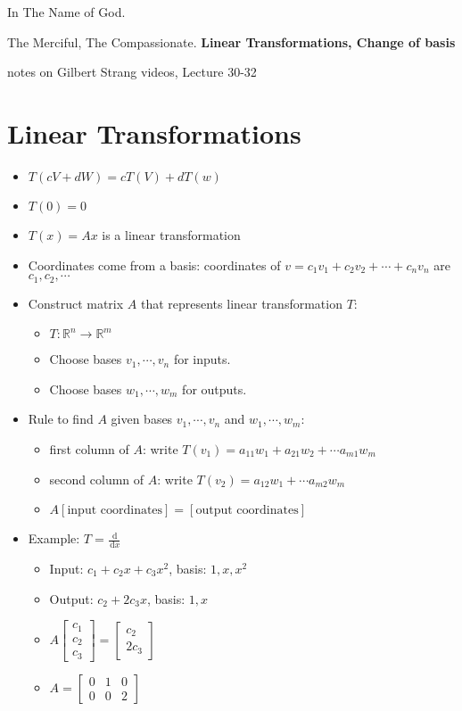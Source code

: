 \documentclass[a4paper,12pt]{article}
\newcommand{\ud}{\,\mathrm{d}}
\theoremstyle{definition} \newtheorem{Theorem}{Theorem}
\begin{document}
\begin{center}
In The Name of God.

The Merciful, The Compassionate.
\vskip 1cm
{\Large\bfseries{Linear Transformations, Change of basis}}

\vskip 0.2cm
\tiny{notes on Gilbert Strang videos, Lecture 30-32}
\end{center}

\section{Linear Transformations}
\begin{itemize}
\item $T(cV+dW) = cT(V) + dT(w)$
\item $T(0) = 0$
\item $T(x) = Ax$ is a linear transformation
\item Coordinates come from a basis: coordinates of $v = c_1 v_1 + c_2 v_2 + \cdots + c_n v_n$ are $c_1, c_2, \cdots $
\item Construct matrix $A$ that represents linear transformation $T$:
\begin{itemize}
\item $T: \mathbb{R}^n \rightarrow \mathbb{R}^m$
\item Choose bases $v_1, \cdots, v_n$ for inputs.
\item Choose bases $w_1, \cdots, w_m$ for outputs.
\end{itemize}
\item Rule to find $A$ given bases $v_1, \cdots, v_n$ and $w_1, \cdots, w_m$:
\begin{itemize}
\item  first column of $A$: write $T(v_1) = a_{11} w_1 + a_{21} w_2 + \cdots a_{m1} w_m$
\item second column of $A$: write $T(v_2) = a_{12} w_1 + \cdots a_{m2} w_m$
\item $A \left[ \text{input coordinates} \right] = \left[ \text{output coordinates} \right]$
\end{itemize}
\item Example: $T=\frac{\ud}{\ud x}$
\begin{itemize}
\item Input: $c_1 + c_2 x + c_3 x^2$, basis: $1, x, x^2$
\item Output: $c_2 + 2 c_3 x$, basis: $1, x$
\item $A\begin{bmatrix}c_1 \\ c_2 \\ c_3\end{bmatrix} = \begin{bmatrix} c_2 \\ 2 c_3\end{bmatrix}$
\item $A = \begin{bmatrix} 0 & 1 & 0  \\ 0 & 0 & 2\end{bmatrix}$
\end{itemize}
\end{itemize}
\end{document}
